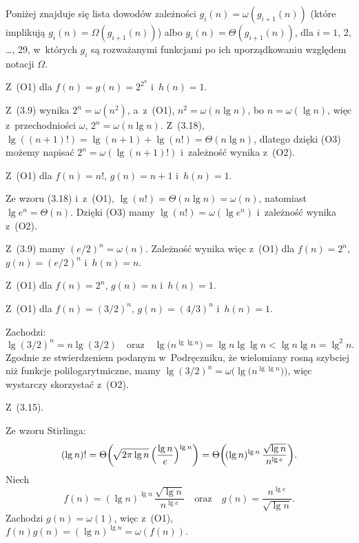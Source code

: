 Poniżej znajduje się lista dowodów zależności $g_i(n)=\omega(g_{i+1}(n))$ (które implikują $g_i(n)=\Omega(g_{i+1}(n))$) albo $g_i(n)=\Theta(g_{i+1}(n))$, dla $i=1$, 2, \dots, 29, w~których $g_i$ są rozważanymi funkcjami po ich uporządkowaniu względem notacji $\Omega$.
\begin{description}[font=\textnormal, topsep=2ex, itemsep=2ex]
	\item[$2^{2^{n+1}}=\omega\bigl(2^{2^n}\bigr)$:]
	Z~(O1) dla $f(n)=g(n)=2^{2^n}$ i~$h(n)=1$.
	\item[$2^{2^n}=\omega((n+1)!)$:]
	Z~(3.9) wynika $2^n=\omega(n^2)$, a~z~(O1), $n^2=\omega(n\lg n)$, bo $n=\omega(\lg n)$, więc z~przechodniości $\omega$, $2^n=\omega(n\lg n)$.
	Z~(3.18), $\lg((n+1)!)=\lg(n+1)+\lg(n!)=\Theta(n\lg n)$, dlatego dzięki (O3) możemy napisać $2^n=\omega(\lg(n+1)!)$ i~zależność wynika z~(O2).
	\item[$(n+1)!=\omega(n!)$:]
	Z~(O1) dla $f(n)=n!$, $g(n)=n+1$ i~$h(n)=1$.
	\item[$n!=\omega(e^n)$:]
	Ze wzoru (3.18) i~z~(O1), $\lg(n!)=\Theta(n\lg n)=\omega(n)$, natomiast $\lg e^n=\Theta(n)$.
	Dzięki (O3) mamy $\lg(n!)=\omega(\lg e^n)$ i~zależność wynika z~(O2).
	\item[$e^n=\omega(n\cdot2^n)$:]
	Z~(3.9) mamy $(e/2)^n=\omega(n)$.
	Zależność wynika więc z~(O1) dla $f(n)=2^n$, $g(n)=(e/2)^n$ i~$h(n)=n$.
	\item[$n\cdot2^n=\omega(2^n)$:]
	Z~(O1) dla $f(n)=2^n$, $g(n)=n$ i~$h(n)=1$.
	\item[$2^n=\omega((3/2)^n)$:]
	Z~(O1) dla $f(n)=(3/2)^n$, $g(n)=(4/3)^n$ i~$h(n)=1$.
	\item[$(3/2)^n=\omega\bigl(n^{\lg\lg n}\bigr)$:]
	Zachodzi:
	\[
		\lg(3/2)^n = n\lg(3/2) \quad\text{oraz}\quad \lg\bigl(n^{\lg\lg n}\bigr) = \lg n\lg\lg n < \lg n\lg n = \lg^2n.
	\]
	Zgodnie ze stwierdzeniem podanym w~Podręczniku, że wielomiany rosną szybciej niż funkcje polilogarytmiczne, mamy $\lg(3/2)^n=\omega\bigr(\!\lg\bigl(n^{\lg\lg n}\bigr)\bigl)$, więc wystarczy skorzystać z~(O2).
	\item[$n^{\lg\lg n}=\Theta\bigl((\lg n)^{\lg n}\bigr)$:]
	Z~(3.15).
	\item[$(\lg n)^{\lg n}=\omega((\lg n)!)$:]
	Ze wzoru Stirlinga:
	\[
		(\lg n)! = \Theta\biggl(\!\sqrt{2\pi\lg n}\,\Bigl(\frac{\lg n}{e}\Bigr)^{\lg n}\biggr) = \Theta\biggl(\!(\lg n)^{\lg n}\,\frac{\sqrt{\lg n}}{n^{\lg e}}\biggr).
	\]
	Niech
	\[
		f(n) = (\lg n)^{\lg n}\,\frac{\sqrt{\lg n}}{n^{\lg e}} \quad\text{oraz}\quad g(n) = \frac{n^{\lg e}}{\sqrt{\lg n}}.
	\]
	Zachodzi $g(n)=\omega(1)$, więc z~(O1), $f(n)g(n)=(\lg n)^{\lg n}=\omega(f(n))$.

\end{description}
